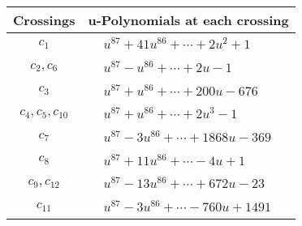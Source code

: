 \documentclass[1p]{elsarticle_modified}
\theoremstyle{definition}
\begin{document}
\begin{tabular}{m{50pt}|m{274pt}}
Crossings & \hspace{64pt}u-Polynomials at each crossing \\
\hline $$\begin{aligned}c_{1}\end{aligned}$$&$\begin{aligned}
&u^{87}+41 u^{86}+\cdots+2 u^2+1
\end{aligned}$\\
\hline $$\begin{aligned}c_{2},c_{6}\end{aligned}$$&$\begin{aligned}
&u^{87}- u^{86}+\cdots+2 u-1
\end{aligned}$\\
\hline $$\begin{aligned}c_{3}\end{aligned}$$&$\begin{aligned}
&u^{87}+u^{86}+\cdots+200 u-676
\end{aligned}$\\
\hline $$\begin{aligned}c_{4},c_{5},c_{10}\end{aligned}$$&$\begin{aligned}
&u^{87}+u^{86}+\cdots+2 u^3-1
\end{aligned}$\\
\hline $$\begin{aligned}c_{7}\end{aligned}$$&$\begin{aligned}
&u^{87}-3 u^{86}+\cdots+1868 u-369
\end{aligned}$\\
\hline $$\begin{aligned}c_{8}\end{aligned}$$&$\begin{aligned}
&u^{87}+11 u^{86}+\cdots-4 u+1
\end{aligned}$\\
\hline $$\begin{aligned}c_{9},c_{12}\end{aligned}$$&$\begin{aligned}
&u^{87}-13 u^{86}+\cdots+672 u-23
\end{aligned}$\\
\hline $$\begin{aligned}c_{11}\end{aligned}$$&$\begin{aligned}
&u^{87}-3 u^{86}+\cdots-760 u+1491
\end{aligned}$\\
\hline
\end{tabular}\newpage\renewcommand{\arraystretch}{1}
\end{document}
